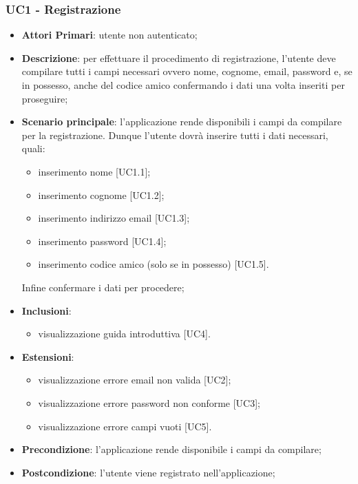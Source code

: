 \subsubsection{UC1 - Registrazione}
\begin{itemize}
	\item \textbf{Attori Primari}: utente non autenticato;
	\item \textbf{Descrizione}: per effettuare il procedimento di registrazione, l'utente deve compilare tutti i campi necessari ovvero nome, cognome, email, password e, se in possesso, anche del codice amico confermando i dati una volta inseriti per proseguire;
	\item \textbf{Scenario principale}: l'applicazione rende disponibili i campi da compilare per la registrazione. Dunque l'utente dovrà inserire tutti i dati necessari, quali:
		\begin{itemize}
			\item inserimento nome [UC1.1];
			\item inserimento cognome [UC1.2];
			\item inserimento indirizzo email [UC1.3];
			\item inserimento password [UC1.4];
			\item inserimento codice amico (solo se in possesso) [UC1.5].
		\end{itemize}
	Infine confermare i dati per procedere;
	\item \textbf{Inclusioni}:
	\begin{itemize}
		\item visualizzazione guida introduttiva [UC4].
	\end{itemize}
	\item \textbf{Estensioni}:
	\begin{itemize}
		\item visualizzazione errore email non valida [UC2];
		\item visualizzazione errore password non conforme [UC3];
		\item visualizzazione errore campi vuoti [UC5]. 
	\end{itemize}
	\item \textbf{Precondizione}: l'applicazione rende disponibile i campi da compilare;
	\item \textbf{Postcondizione}: l'utente viene registrato nell'applicazione; 
\end{itemize}
